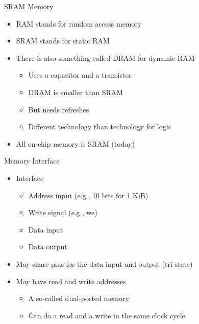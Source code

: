 \begin{frame}[fragile]{SRAM Memory}
\begin{itemize}
\item RAM stands for random access memory
\item SRAM stands for static RAM
\item There is also something called DRAM for dynamic RAM
\begin{itemize}
\item Uses a capacitor and a transistor
\item DRAM is smaller than SRAM
\item But needs refreshes
\item Different technology than technology for logic
\end{itemize}
\item All on-chip memory is SRAM (today)
\end{itemize}
\end{frame}

\begin{frame}[fragile]{Memory Interface}
\begin{itemize}
\item Interface
\begin{itemize}
\item Address input (e.g., 10 bits for 1 KiB)
\item Write signal (e.g., we)
\item Data input
\item Data output
\end{itemize}
\item May share pins for the data input and output (tri-state)
\item May have read and write addresses
\begin{itemize}
\item A so-called dual-ported memory
\item Can do a read and a write in the same clock cycle
\end{itemize}
\end{itemize}
\end{frame}



